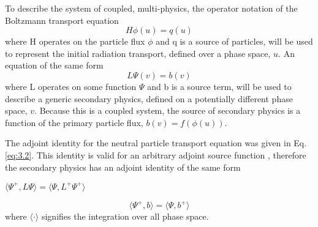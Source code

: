 To describe the system of coupled, multi-physics,
the operator notation of the Boltzmann transport equation
\begin{equation}
	H\phi(u) = q(u)
\end{equation}
where H operates on the particle flux $\phi$ and q is a source of particles, 
will be used to represent the initial radiation transport, defined over a
phase space, $u$.
An equation of the same form 
\begin{equation}
	L\Psi(v) = b(v)
\end{equation}
where L operates
on some function $\Psi$ and b is a source term, will be used
to describe a generic secondary physics, defined on a potentially
different phase space, $v$.
Because this is a coupled system, the source of secondary physics is a function
of the primary particle flux, $b(v) = f(\phi(u))$.

The adjoint identity for the neutral particle transport
equation was given in Eq. \ref{eq:3.2}.
This identity is valid for an arbitrary adjoint source function \cite{l_m}, 
therefore the secondary physics has an adjoint identity of the same
form
\begin{center}
{$\langle \Psi^{+}, L\Psi \rangle = \langle \Psi, L^{+}\Psi^{+} \rangle $}
\end{center}
\begin{equation}\label{eq:adj_2_identity}
	\langle \Psi^{+}, b \rangle =
	\langle \Psi, b^{+} \rangle 
\end{equation}
where $\langle \cdot \rangle$ signifies the integration over all phase space.

